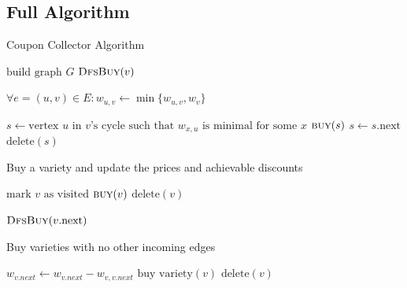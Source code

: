 \documentclass[12pt]{article}
\begin{document}
\subsection*{Full Algorithm}
\begin{algorithm}
  \caption{Coupon Collector Algorithm}
  \begin{algorithmic}[1]

		\State $\mbox{build graph $G$}$
				\State $\Call{DfsBuy}{v}$
			\EndIf
		\EndFor
		
		\State $\forall e=(u,v) \in E: w_{u,v} \gets \min \{w_{u,v}, w_{v} \}$
				
			\State $s \gets \mbox{vertex $u$ in $v$'s cycle such that $w_{x,u}$ is minimal for some $x$}$
				\State $\Call{buy}{s}$
				\State $s \gets s.\mbox{next}$
				\State $\mbox{delete}(s)$
			\EndWhile
		\EndFor
    \EndFunction
  \end{algorithmic}
\end{algorithm}

\begin{algorithm}
  \caption{Buy a variety and update the prices and achievable discounts}
  \begin{algorithmic}[1]

		\State $\mbox{mark $v$ as visited}$
			\State $\Call{buy}{v}$
			\State $\mbox{delete}(v)$
		\EndIf
		
			\State $\Call{DfsBuy}{v.\mbox{next}}$
		\EndIf
    \EndFunction
  \end{algorithmic}
\end{algorithm}

\begin{algorithm}
  \caption{Buy varieties with no other incoming edges}
  \begin{algorithmic}[1]

		\State $w_{v.\mathit{next}} \gets w_{v.\mathit{next}} - w_{v, v.\mathit{next}}$
		\State $\mbox{buy variety}(v)$
		\State $\mbox{delete}(v)$

    \EndFunction
  \end{algorithmic}
\end{algorithm}
\end{document}
